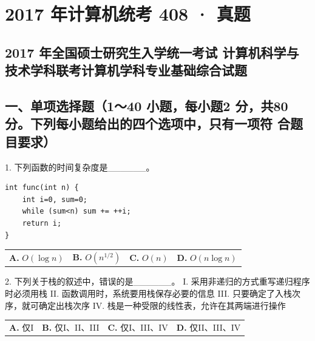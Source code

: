 \documentclass[UTF8,11pt]{ctexart}
\begin{document}
\section*{2017 年计算机统考 408 · 真题}
\subsection*{2017 年全国硕士研究生入学统一考试 计算机科学与技术学科联考计算机学科专业基础综合试题}

\subsection*{一、单项选择题（1～40 小题，每小题2 分，共80 分。下列每小题给出的四个选项中，只有一项符 合题目要求）}

1. 下列函数的时间复杂度是\_\_\_\_\_\_。


\begin{Verbatim}[breaklines,breakanywhere,fontsize=\small]
int func(int n) {
    int i=0, sum=0;
    while (sum<n) sum += ++i;
    return i;
}
\end{Verbatim}

\begin{center}\begin{tabular}{>{\raggedright\arraybackslash}p{\dimexpr(\linewidth-8\tabcolsep)/4\relax}>{\raggedright\arraybackslash}p{\dimexpr(\linewidth-8\tabcolsep)/4\relax}>{\raggedright\arraybackslash}p{\dimexpr(\linewidth-8\tabcolsep)/4\relax}>{\raggedright\arraybackslash}p{\dimexpr(\linewidth-8\tabcolsep)/4\relax}}
\textbf{A.} \(\displaystyle O(\log n)\) & \textbf{B.} \(\displaystyle O(n^{1/2})\) & \textbf{C.} \(\displaystyle O(n)\) & \textbf{D.} \(\displaystyle O(n\log n)\)\\[.35em]\end{tabular}\end{center}

2. 下列关于栈的叙述中，错误的是\_\_\_\_\_\_。 I. 采用非递归的方式重写递归程序时必须用栈 II. 函数调用时，系统要用栈保存必要的信息 III. 只要确定了入栈次序，就可确定出栈次序 IV. 栈是一种受限的线性表，允许在其两端进行操作


\begin{center}\begin{tabular}{>{\raggedright\arraybackslash}p{\dimexpr(\linewidth-8\tabcolsep)/4\relax}>{\raggedright\arraybackslash}p{\dimexpr(\linewidth-8\tabcolsep)/4\relax}>{\raggedright\arraybackslash}p{\dimexpr(\linewidth-8\tabcolsep)/4\relax}>{\raggedright\arraybackslash}p{\dimexpr(\linewidth-8\tabcolsep)/4\relax}}
\textbf{A.} 仅I & \textbf{B.} 仅I、II、III & \textbf{C.} 仅I、III、IV & \textbf{D.} 仅II、III、IV\\[.35em]\end{tabular}\end{center}
\end{document}
